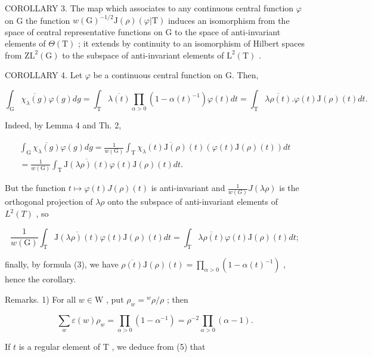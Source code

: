 COROLLARY 3. The map which associates to any continuous central function \(\varphi\) on G the function \(w(\mathrm{G})^{-1/2}\mathrm{J}(\rho)(\varphi|\mathrm{T})\) induces an isomorphism from the space of central representative functions on G to the space of anti-invariant elements of \(\Theta(\mathrm{T})\) ; it extends by continuity to an isomorphism of Hilbert spaces from \(\mathrm{ZL}^2(\mathrm{G})\) to the subspace of anti-invariant elements of \(\mathrm{L}^2(\mathrm{T})\) .

COROLLARY 4. Let \(\varphi\) be a continuous central function on G. Then,

\[
\int_ {\mathrm{G}} \overline {{\chi_ {\lambda} (g)}} \varphi (g) d g = \int_ {\mathrm{T}} \overline {{\lambda (t)}} \prod_ {\alpha > 0} (1 - \alpha (t) ^ {- 1}) \varphi (t) d t = \int_ {\mathrm{T}} \overline {{\lambda \rho (t)}}. \varphi (t) \mathrm{J} (\rho) (t) d t.
\]

Indeed, by Lemma 4 and Th. 2,

\[
\begin{array}{c} \int_ {\mathrm{G}} \overline {{\chi_ {\lambda} (g)}} \varphi (g) d g = \frac {1}{w (\mathrm{G})} \int_ {\mathrm{T}} \overline {{\chi_ {\lambda} (t) \mathrm{J} (\rho) (t)}} (\varphi (t) \mathrm{J} (\rho) (t)) d t \\ = \frac {1}{w (\mathrm{G})} \int_ {\mathrm{T}} \overline {{\mathrm{J} (\lambda \rho) (t)}} \varphi (t) \mathrm{J} (\rho) (t) d t. \end{array}
\]

But the function \(t \mapsto \varphi(t)J(\rho)(t)\) is anti-invariant and \(\frac{1}{w(G)}J(\lambda\rho)\) is the orthogonal projection of \(\lambda\rho\) onto the subspace of anti-invariant elements of \(L^{2}(T)\) , so

\[
\frac {1}{w (\mathrm{G})} \int_ {\mathrm{T}} \overline {{\mathrm{J} (\lambda \rho) (t)}} \varphi (t) \mathrm{J} (\rho) (t) d t = \int_ {\mathrm{T}} \overline {{\lambda \rho (t)}} \varphi (t) \mathrm{J} (\rho) (t) d t;
\]

finally, by formula (3), we have \(\overline{\rho(t)}\mathrm{J}(\rho)(t) = \prod_{\alpha >0}(1 - \alpha (t)^{-1})\) , hence the corollary.

Remarks. 1) For all \(w \in \mathrm{W}\) , put \(\rho_w = {}^w\rho /\rho\) ; then

\[
\sum_ {w} \varepsilon (w) \rho_ {w} = \prod_ {\alpha > 0} (1 - \alpha^ {- 1}) = \rho^ {- 2} \prod_ {\alpha > 0} (\alpha - 1).\tag{6}
\]

If \(t\) is a regular element of \(\mathrm{T}\) , we deduce from (5) that

